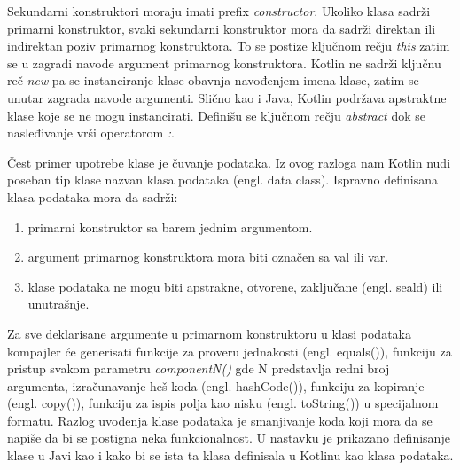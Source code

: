 \documentclass[12pt,oneside]{memoir}
\begin{document}
Sekundarni konstruktori moraju imati prefix \emph{constructor}. Ukoliko klasa sadrži primarni konstruktor, svaki sekundarni konstruktor mora da sadrži direktan ili indirektan poziv primarnog konstruktora. To se postize ključnom rečju \emph{this} zatim se u zagradi navode argument primarnog konstruktora. Kotlin ne sadrži ključnu reč \emph{new} pa se instanciranje klase obavnja navođenjem imena klase, zatim se unutar zagrada navode argumenti. Slično kao i Java, Kotlin podržava apstraktne klase koje se ne mogu instancirati. Definišu se ključnom rečju \emph{abstract} dok se nasleđivanje vrši operatorom \emph{:}.
 
Čest primer upotrebe klase je čuvanje podataka. Iz ovog razloga nam Kotlin nudi poseban tip klase nazvan klasa podataka (engl. data class). Ispravno definisana klasa podataka mora da sadrži:
\begin{enumerate}
  \item primarni konstruktor sa barem jednim argumentom.
  \item argument primarnog konstruktora mora biti označen sa val ili var.
  \item klase podataka ne mogu biti apstrakne, otvorene, zaključane (engl. seald) ili unutrašnje.
\end{enumerate}


Za sve deklarisane argumente u primarnom konstruktoru u klasi podataka kompajler će generisati funkcije za proveru jednakosti (engl. equals()), funkciju za pristup svakom parametru \emph{componentN()} gde N predstavlja redni broj argumenta, izračunavanje heš koda (engl. hashCode()), funkciju za kopiranje (engl. copy()), funkciju za ispis polja kao nisku (engl. toString()) u specijalnom formatu. Razlog uvođenja klase podataka je smanjivanje koda koji mora da se napiše da bi se postigna neka funkcionalnost. U nastavku je prikazano definisanje klase u Javi kao i kako bi se ista ta klasa definisala u Kotlinu kao klasa podataka.
\end{document}
